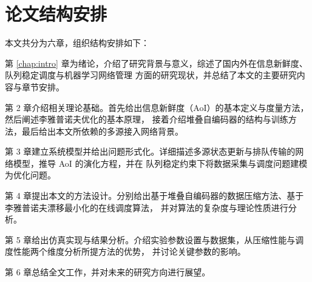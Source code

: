 \section{论文结构安排}

本文共分为六章，组织结构安排如下：

第 \cref{chap:intro} 章为绪论，介绍了研究背景与意义，综述了国内外在信息新鲜度、队列稳定调度与机器学习网络管理
方面的研究现状，并总结了本文的主要研究内容与章节安排。

第 2 章介绍相关理论基础。首先给出信息新鲜度（AoI）的基本定义与度量方法，然后阐述李雅普诺夫优化的基本原理，
接着介绍堆叠自编码器的结构与训练方法，最后给出本文所依赖的多源接入网络背景。

第 3 章建立系统模型并给出问题形式化。详细描述多源状态更新与排队传输的网络模型，推导 AoI 的演化方程，并在
队列稳定约束下将数据采集与调度问题建模为优化问题。

第 4 章提出本文的方法设计。分别给出基于堆叠自编码器的数据压缩方法、基于李雅普诺夫漂移最小化的在线调度算法，
并对算法的复杂度与理论性质进行分析。

第 5 章给出仿真实现与结果分析。介绍实验参数设置与数据集，从压缩性能与调度性能两个维度分析所提方法的优势，
并讨论关键参数的影响。

第 6 章总结全文工作，并对未来的研究方向进行展望。
